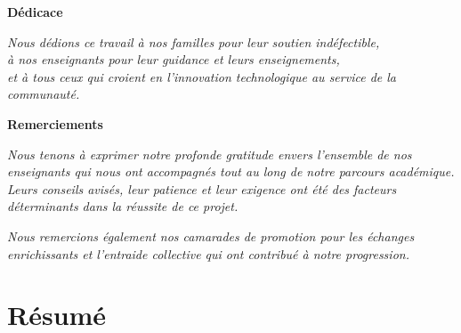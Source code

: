 \documentclass[12pt,a4paper]{article}
\begin{document}
\newpage

\thispagestyle{empty}
\vspace*{5cm}

\begin{center}
{\large\bfseries\color{HEECnavy} Dédicace}
\end{center}

\vspace{1cm}

\begin{center}
{\large\textit{Nous dédions ce travail à nos familles pour leur soutien indéfectible,\\
à nos enseignants pour leur guidance et leurs enseignements,\\
et à tous ceux qui croient en l'innovation technologique au service de la communauté.}}
\end{center}

\newpage

\thispagestyle{empty}
\vspace*{3cm}

\begin{center}
{\large\bfseries\color{HEECnavy} Remerciements}
\end{center}

\vspace{1cm}

{\large\textit{Nous tenons à exprimer notre profonde gratitude envers l'ensemble de nos enseignants qui nous ont accompagnés tout au long de notre parcours académique. Leurs conseils avisés, leur patience et leur exigence ont été des facteurs déterminants dans la réussite de ce projet.}}

\vspace{0.5cm}

{\large\textit{Nous remercions également nos camarades de promotion pour les échanges enrichissants et l'entraide collective qui ont contribué à notre progression.}}

\newpage

\thispagestyle{empty}
\section*{Résumé}
\end{document}
